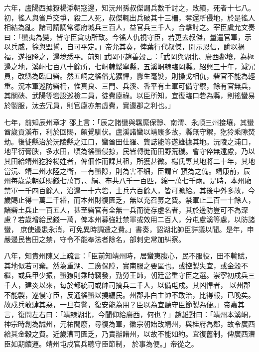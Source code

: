 \begin{pinyinscope}
 六年，盧陽西據獠楊添朝寇邊，知沅州孫叔傑調兵數千討之，敗績，死者十七八。初，徭人與省戶交爭，殺二人死，叔傑輒出兵破其十三柵，奪還所侵地，於是徭人相結為亂。諸司請調常德府城兵三百人，益官兵三千人，合擊討之。宰臣虞允文奏曰：「蠻夷為變，皆守臣貪功所致。今徭人仇視守臣，若更去叔傑，量遣官軍，示以兵威，徐與盟誓，自可平定。」帝允其奏，俾葉行代叔傑，開示恩信，諭以禍福，遂招降之，邊境悉平。前知
 武岡軍趙善穀言：「武岡與湖北、廣西鄰壤，為極邊之地，溪峒七百八十餘所，七峒隸綏寧縣，五溪峒隸臨岡縣。紹興三十年，減冗員，改縣為臨口砦。然五峒之徭俗尤獷悍，釁生毫髮，則操戈相仇，砦官不能為輕重。況本軍巡防砦柵，惟真良、三門、兵溪、香平有土軍可備守禦，餘有官無兵，其關硤、武陽等砦設巡檢二員，徒費廩祿。以臣所知，宜復臨口砦為縣，則徭蠻易於製服，汰去冗員，則官廩亦無虛費，實邊郡之利也。」



 七年，前知辰州章才
 邵上言：「辰之諸蠻與羈縻保靜、南渭、永順三州接壤，其蠻酋歲貢溪布，利於回賜，頗覺馴伏。盧溪諸蠻以靖康多故，縣無守禦，犵狑乘隙焚劫。後徙縣治於沅陵縣之江口，蠻酋田仕羅、龔誌能等遂雄據其地。沅陵之浦口，地平衍膏腴，多水田，頃為徭蠻侵掠，民皆轉徙而田野荒穢。會守倅無遠慮，乃以其田給靖州犵狑楊姓者，俾佃作而課其租，所獲甚微。楊氏專其地將二十年，其地當沅、靖二州水陸之衝，一有蠻隙，則為害不細，臣謂宜
 預為之備。靖康前，辰州每歲蒙朝廷賜錢七萬貫，、絹、布共八千一百匹，綿一萬七千兩。是時，本州廂禁軍一千四百餘人，沿邊一十六砦，土兵六百餘人，皆可贍給。其後中外多故，今歲賜止得一萬二千緡，而本州財復匱乏，無以充召募之費。禁軍止二百一十餘人，諸砦土兵止一百五人，甚至砦官有全無一兵而徒存虛名者，其於邊防豈可不為深慮？若歲增給民錢一萬，俾本州募強壯禁軍或效用二百人，分屯盧溪等處，以防諸蠻，
 庶使邊患永消，可免異時調遣之費。」書奏，詔湖北帥臣詳議以聞。是年，申嚴邊民售田之禁，守令不能奉法者除名，部刺史常加糾察。



 八年，知貴州陳乂上疏言：「臣前知靖州時，居蠻夷腹心，民不服役，田不輸賦，其地似若可棄。然為重湖、二廣保障，實南服之要區也。或控製失宜，或金穀不繼，或兵甲少振，蠻獠則乘時竊發，勤勞王師，朝廷當重守臣之選。崇寧初戍兵三千人，建炎以來，每於都統司或帥司摘兵二千人，以備屯戍。其凶悍者，
 以州郡不能製，遂慢守臣，反通徭蠻以撓編民。州郡非白主帥不敢治，比得報，已晚矣。故戍兵敢肆其惡，一旦有警，復安能為用？臣以為宜聽守臣節製為便。」帝嘉其言，復問左右曰：「靖隸湖北，今聞仰給廣西，何也？」趙雄對曰：「靖州本溪峒，神宗時創為誠州，元祐間廢，尋復為軍，徽宗朝始改靖州，與桂府為鄰，故令廣西給其金穀之費。近歲漕司匱乏，乃責辦諸州，以故不能如約。宜復舊制，俾廣西漕臣如期饋運。靖州屯戍官兵聽守臣節制，
 於事為便。」帝從之。




\end{pinyinscope}
